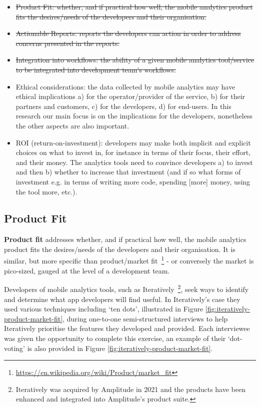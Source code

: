 {\small
\begin{itemize}
    \itemsep0em
    \item \sout{Product Fit: whether, and if practical how well, the mobile analytics product fits the desires/needs of the developers and their organisation.}
    \item \sout{Actionable Reports: reports the developers can action in order to address concerns presented in the reports.}
    \item \sout{Integration into workflows: the ability of a given mobile analytics tool/service to be integrated into development team's workflows.}
    \item Ethical considerations: the data collected by mobile analytics may have ethical implications a) for the operator/provider of the service, b) for their partners and customers, c) for the developers, d) for end-users. In this research our main focus is on the implications for the developers, nonetheless the other aspects are also important.
    \item ROI (return-on-investment): developers may make both implicit and explicit choices on what to invest in, for instance in terms of their focus, their effort, and their money. The analytics tools need to convince developers a) to invest and then b) whether to increase that investment (and if so what forms of investment e.g. in terms of writing more code, spending [more] money, using the tool more, etc.).

\end{itemize}
}

\subsection{Product Fit}
\textbf{Product fit} addresses whether, and if practical how well, the mobile analytics product fits the desires/needs of the developers and their organisation. It is similar, but more specific than product/market fit~\footnote{\url{https://en.wikipedia.org/wiki/Product/market_fit}} - or conversely the market is pico-sized, gauged at the level of a development team. %

Developers of mobile analytics tools, such as Iteratively~\footnote{Iteratively was acquired by Amplitude in 2021 and the products have been enhanced and integrated into Amplitude's product suite.}, seek ways to identify and determine what app developers will find useful. In Iteratively's case they used various techniques including `ten dots', illustrated in Figure \ref{fig:iteratively-product-market-fit}, during one-to-one semi-structured interviews to help Iteratively prioritise the features they developed and provided. Each interviewee was given the opportunity to complete this exercise, an example of their `dot-voting' is also provided in Figure \ref{fig:iteratively-product-market-fit}.

